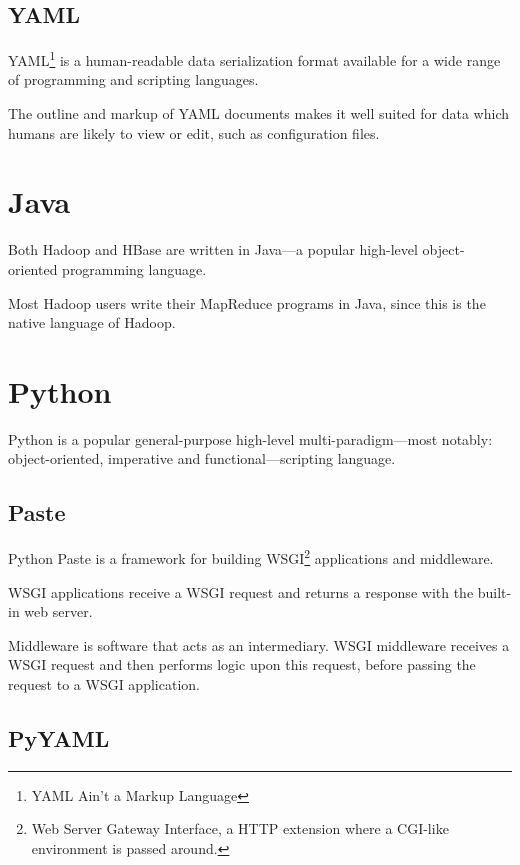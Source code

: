 \documentclass[a4paper,10pt]{book}
\begin{document}
\subsection{YAML}

YAML\footnote{YAML Ain't a Markup Language} is a human-readable data
serialization format available for a wide range of programming and
scripting languages.

The outline and markup of YAML documents makes it well suited for data
which humans are likely to view or edit, such as configuration files.



\section{Java}

Both Hadoop and HBase are written in Java---a popular high-level
object-oriented programming language.

Most Hadoop users write their MapReduce programs in Java, since this is the
native language of Hadoop.



\section{Python}

Python is a popular general-purpose high-level multi-paradigm---most
notably: object-oriented, imperative and functional---scripting language.


\subsection{Paste}

Python Paste is a framework for building WSGI\footnote{Web Server Gateway
Interface, a HTTP extension where a CGI-like environment is passed around.}
applications and middleware.

WSGI applications receive a WSGI request and returns a response with the
built-in web server.

Middleware is software that acts as an intermediary. WSGI middleware
receives a WSGI request and then performs logic upon this request, before
passing the request to a WSGI application.


\subsection{PyYAML}
\end{document}
